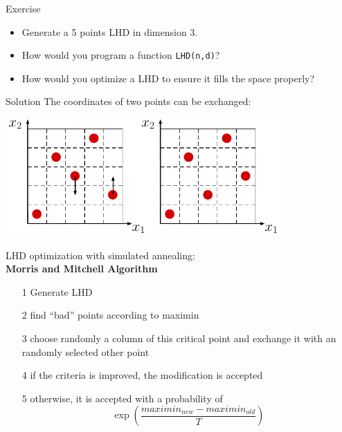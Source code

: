 \begin{frame}{}
\begin{exampleblock}{Exercise}
\begin{itemize}
	\item Generate a 5 points LHD in dimension 3.
	\item How would you program a function \texttt{LHD(n,d)}?
	\item How would you optimize a LHD to ensure it fills the space properly?
\end{itemize}
\end{exampleblock}
\end{frame}

\begin{frame}{}
\begin{exampleblock}{Solution}
The coordinates of two points can be exchanged:\\
\vspace{4mm}
\begin{center}
\includegraphics[height=4.5cm]{2_Design_of_experiments/figures/latexdraw/lhs3}
\end{center}
\end{exampleblock}
\end{frame}

\begin{frame}{}
LHD optimization with simulated annealing:\\
\vspace{4mm}
\textbf{Morris and Mitchell Algorithm}\\
\vspace{2mm}
\begin{itemize}
	\item[1] Generate LHD
	\item[2] find ``bad'' points according to maximin
	\item[3] choose randomly a column of this critical point and exchange it with an randomly selected other point
	\item[4] \qquad if the criteria is improved, the modification is accepted
	\item[5] \qquad otherwise, it is accepted with a probability of $$\exp \left(\frac{maximin_{new}-maximin_{old}}{T}\right)$$
	\end{itemize}
\end{frame}




